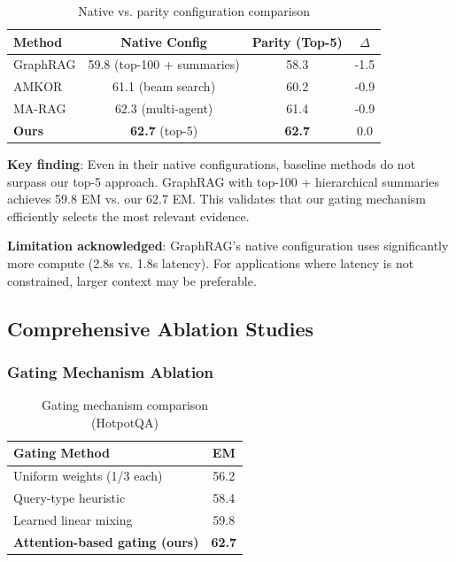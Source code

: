 \documentclass[10pt,twocolumn]{article}
\begin{document}
\begin{table}[t]
\centering
\caption{Native vs. parity configuration comparison}
\label{tab:native_config}
\small
\begin{tabular}{@{}lccc@{}}
\toprule
\textbf{Method} & \textbf{Native Config} & \textbf{Parity (Top-5)} & \textbf{$\Delta$} \\
\midrule
GraphRAG & 59.8 (top-100 + summaries) & 58.3 & -1.5 \\
AMKOR & 61.1 (beam search) & 60.2 & -0.9 \\
MA-RAG & 62.3 (multi-agent) & 61.4 & -0.9 \\
\midrule
\textbf{Ours} & \textbf{62.7} (top-5) & \textbf{62.7} & 0.0 \\
\bottomrule
\end{tabular}
\end{table}

\textbf{Key finding}: Even in their native configurations, baseline methods do not surpass our top-5 approach. GraphRAG with top-100 + hierarchical summaries achieves 59.8 EM vs. our 62.7 EM. This validates that our gating mechanism efficiently selects the most relevant evidence.

\textbf{Limitation acknowledged}: GraphRAG's native configuration uses significantly more compute (2.8s vs. 1.8s latency). For applications where latency is not constrained, larger context may be preferable.


\subsection{Comprehensive Ablation Studies}
\label{sec:ablations}

\subsubsection{Gating Mechanism Ablation}
\label{sec:gating_ablation}

\begin{table}[h]
\centering
\caption{Gating mechanism comparison (HotpotQA)}
\label{tab:gating_ablation}
\small
\begin{tabular}{@{}lc@{}}
\toprule
\textbf{Gating Method} & \textbf{EM} \\
\midrule
Uniform weights (1/3 each) & 56.2 \\
Query-type heuristic & 58.4 \\
Learned linear mixing & 59.8 \\
\textbf{Attention-based gating (ours)} & \textbf{62.7} \\
\bottomrule
\end{tabular}
\end{table}
\end{document}
